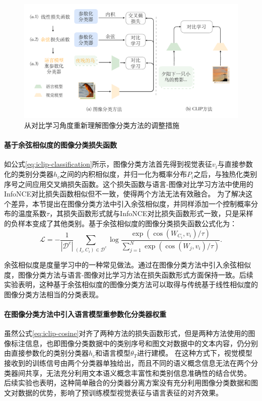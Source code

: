 \begin{figure}
  \centering
  \includegraphics[width=1.0\linewidth]{figures/iclip-adapt-v2.pdf}
  \caption{从对比学习角度重新理解图像分类方法的调整措施}
  \label{fig:iclip-adapt}
\end{figure}

\paragraph{基于余弦相似度的图像分类损失函数} 如公式\eqref{eq:iclip-classification}所示，图像分类方法首先得到视觉表征$v_{i}$与直接参数化的类别分类器$h_{c}$之间的内积相似度，并归一化为概率分布$P_i$之后，与独热化类别序号之间应用交叉熵损失函数。这个损失函数与语言-图像对比学习方法中使用的InfoNCE对比损失函数相似但不一致，使得两个方法无法有效融合。
为了解决这个差异，本节提出在图像分类方法中引入余弦相似度，并同样添加一个控制概率分布的温度系数$\tau$，其损失函数形式就与InfoNCE对比损失函数形式一致，只是采样的负样本变成了其他类别。基于余弦相似度的图像分类损失函数公式化为：
\begin{equation}
    \mathcal{L}=-\frac{1}{\left|\mathcal{D}^{c}\right|} \sum_{\left(I_{i}, C_{i}\right) \in \mathcal{D}^{c}} \log \frac{\exp \left(\cos \left(W_{C_{i}}, v_{i}\right) / \tau\right)}{\sum_{j=1}^{N} \exp \left(\cos \left(W_{j}, v_{i}\right) / \tau\right)}.
    \label{eq:iclip-cosine}
\end{equation}

余弦相似度是度量学习\cite{nguyen2010cosine}中的一种常见做法。通过在图像分类方法中引入余弦相似度，图像分类方法与语言-图像对比学习方法在损失函数形式方面保持一致。后续实验表明，这种基于余弦相似度的图像分类方法可以取得与传统基于线性相似度的图像分类方法相当的分类表现。

\paragraph{在图像分类方法中引入语言模型重参数化分类器权重} 虽然公式\eqref{eq:iclip-cosine}对齐了两种方法的损失函数形式，但是两种方法使用的图像标注信息，也即图像分类数据中的类别序号和图文对数据中的文本内容，仍分别由直接参数化的类别分类器$h_{c}$和语言模型$\theta_{T}$进行建模。
在这种方式下，视觉模型接收到的训练信号由两个分类器单独给出，而且不同的语义概念信息无法在两个分类器间共享，无法充分利用文本语义概念丰富性和类别信息准确性的结合优势。
后续实验也表明，这种简单融合的分类器分离方案没有充分利用图像分类数据和图文对数据的优势，影响了预训练模型视觉表征与语言表征的对齐效果。

